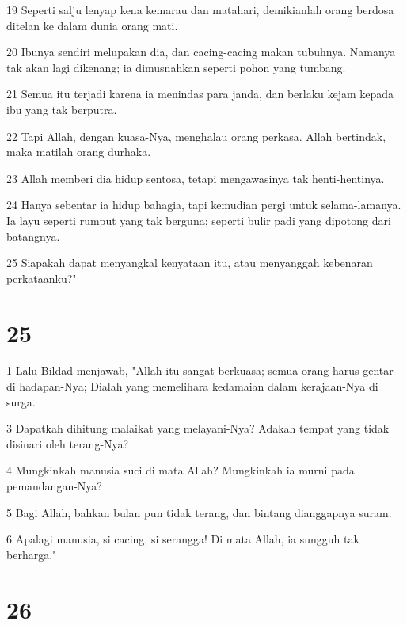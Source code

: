 \par 19 Seperti salju lenyap kena kemarau dan matahari, demikianlah orang berdosa ditelan ke dalam dunia orang mati.
\par 20 Ibunya sendiri melupakan dia, dan cacing-cacing makan tubuhnya. Namanya tak akan lagi dikenang; ia dimusnahkan seperti pohon yang tumbang.
\par 21 Semua itu terjadi karena ia menindas para janda, dan berlaku kejam kepada ibu yang tak berputra.
\par 22 Tapi Allah, dengan kuasa-Nya, menghalau orang perkasa. Allah bertindak, maka matilah orang durhaka.
\par 23 Allah memberi dia hidup sentosa, tetapi mengawasinya tak henti-hentinya.
\par 24 Hanya sebentar ia hidup bahagia, tapi kemudian pergi untuk selama-lamanya. Ia layu seperti rumput yang tak berguna; seperti bulir padi yang dipotong dari batangnya.
\par 25 Siapakah dapat menyangkal kenyataan itu, atau menyanggah kebenaran perkataanku?"

\chapter{25}

\par 1 Lalu Bildad menjawab, "Allah itu sangat berkuasa; semua orang harus gentar di hadapan-Nya; Dialah yang memelihara kedamaian dalam kerajaan-Nya di surga.
\par 3 Dapatkah dihitung malaikat yang melayani-Nya? Adakah tempat yang tidak disinari oleh terang-Nya?
\par 4 Mungkinkah manusia suci di mata Allah? Mungkinkah ia murni pada pemandangan-Nya?
\par 5 Bagi Allah, bahkan bulan pun tidak terang, dan bintang dianggapnya suram.
\par 6 Apalagi manusia, si cacing, si serangga! Di mata Allah, ia sungguh tak berharga."

\chapter{26}

